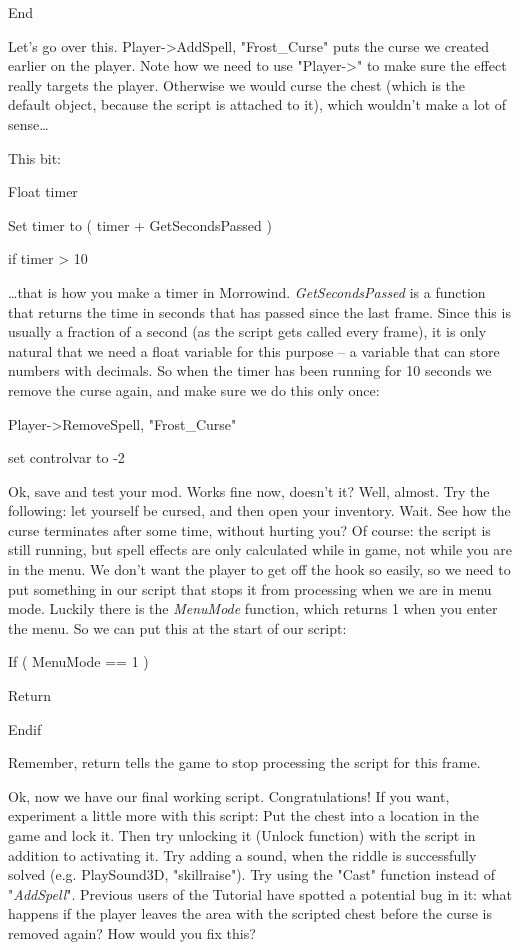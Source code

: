 \documentclass[
]{article}
\begin{document}
End

Let's go over this. Player-\textgreater AddSpell, "Frost\_Curse" puts
the curse we created earlier on the player. Note how we need to use
"Player-\textgreater" to make sure the effect really targets the player.
Otherwise we would curse the chest (which is the default object, because
the script is attached to it), which wouldn't make a lot of
sense\ldots{}

This bit:

Float timer

Set timer to ( timer + GetSecondsPassed )

if timer \textgreater{} 10

\ldots that is how you make a timer in Morrowind.
\emph{GetSecondsPassed} is a function that returns the time in seconds
that has passed since the last frame. Since this is usually a fraction
of a second (as the script gets called every frame), it is only natural
that we need a float variable for this purpose -- a variable that can
store numbers with decimals. So when the timer has been running for 10
seconds we remove the curse again, and make sure we do this only once:

Player-\textgreater RemoveSpell, "Frost\_Curse"

set controlvar to -2

Ok, save and test your mod. Works fine now, doesn't it? Well, almost.
Try the following: let yourself be cursed, and then open your inventory.
Wait. See how the curse terminates after some time, without hurting you?
Of course: the script is still running, but spell effects are only
calculated while in game, not while you are in the menu. We don't want
the player to get off the hook so easily, so we need to put something in
our script that stops it from processing when we are in menu mode.
Luckily there is the \emph{MenuMode} function, which returns 1 when you
enter the menu. So we can put this at the start of our script:

If ( MenuMode == 1 )

Return

Endif

Remember, return tells the game to stop processing the script for this
frame.

Ok, now we have our final working script. Congratulations! If you want,
experiment a little more with this script: Put the chest into a location
in the game and lock it. Then try unlocking it (Unlock function) with
the script in addition to activating it. Try adding a sound, when the
riddle is successfully solved (e.g. PlaySound3D, "skillraise"). Try
using the "Cast" function instead of "\emph{AddSpell}". Previous users
of the Tutorial have spotted a potential bug in it: what happens if the
player leaves the area with the scripted chest before the curse is
removed again? How would you fix this?
\end{document}
